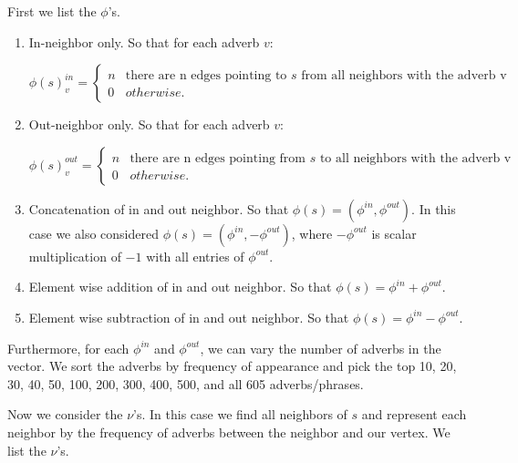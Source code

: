 First we list the $\phi$'s.

\begin{enumerate}
	\item In-neighbor only. So that for each adverb $v$:

		\[   
		\phi(s)^{in}_v = \left\{
		\begin{array}{ll}
		      n & \text{there are n edges pointing to $s$ from all neighbors with the adverb v} \\
		      0 & otherwise.
		\end{array} 
		\right.
		\]

	\item Out-neighbor only. So that for each adverb $v$:

		\[   
		\phi(s)^{out}_v = \left\{
		\begin{array}{ll}
		      n & \text{there are n edges pointing from $s$ to all neighbors with the adverb v} \\
		      0 & otherwise.
		\end{array} 
		\right. 
		\]

	\item Concatenation of in and out neighbor. So that $\phi(s) = (\phi^{in}, \phi^{out})$. In this case we also considered $\phi(s) = (\phi^{in}, - \phi^{out})$, where $- \phi^{out}$ is scalar multiplication of $-1$ with all entries of $\phi^{out}$.

	\item Element wise addition of in and out neighbor. So that $\phi(s) = \phi^{in} + \phi^{out}$.
	
	\item Element wise subtraction of in and out neighbor. So that $\phi(s) = \phi^{in} - \phi^{out}$.

\end{enumerate}

Furthermore, for each $\phi^{in}$ and $\phi^{out}$, we can vary the number of adverbs in the vector. We sort the adverbs by frequency of appearance and pick the top 10, 20, 30, 40, 50, 100, 200, 300, 400, 500, and all 605 adverbs/phrases. 

Now we consider the $\nu$'s. In this case we find all neighbors of $s$ and represent each neighbor by the frequency of adverbs between the neighbor and our vertex. We list the $\nu$'s.

